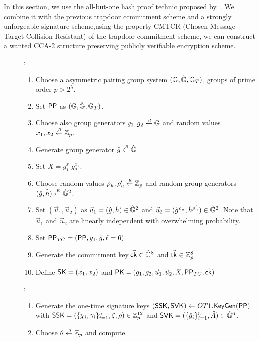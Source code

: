 In this section, we use the all-but-one hash proof technic proposed by~\cite{DBLP:conf/tcc/LibertY12}. We combine it with the previous trapdoor commitment scheme and a strongly unforgeable signature scheme,using the property CMTCR (Chosen-Message Target Collision Resistant) of the trapdoor commitment scheme, we can construct a wanted CCA-2 structure preserving publicly verifiable encryption scheme.
\begin{description}

\item[]:
  \begin{enumerate}
  \item Choose a asymmetric pairing group system $(\mathbb{G}, \hat{\mathbb{G}}, \mathbb{G}_T)$, groups of prime order $p > 2^\lambda$.
  \item Set $\mathsf{PP}$ as $(\mathbb{G}, \hat{\mathbb{G}}, \mathbb{G}_T)$.
  \item Choose also group generators $g_1, g_2 \stackrel{{\scriptscriptstyle \mkern4mu R}}{\gets} \mathbb{G}$ and random values $x_1, x_2 \stackrel{{\scriptscriptstyle \mkern4mu R}}{\gets} \mathbb{Z}_p$.
  \item Generate group generator $\hat{g} \stackrel{{\scriptscriptstyle \mkern4mu R}}{\gets} \hat{\mathbb{G}}$
  \item Set $X = g_1^{x_1}g_2^{x_2}$.
  \item Choose random values $\rho_u,\rho_u' \stackrel{{\scriptscriptstyle \mkern4mu R}}{\gets} \mathbb{Z}_p$ and random group generators $(\hat{g}, \hat{h}) \stackrel{{\scriptscriptstyle \mkern4mu R}}{\gets} \hat{\mathbb{G}}^2$.
  \item Set $(\vec{u}_1, \vec{u}_2)$ as $\vec{u}_1 = (\hat{g}, \hat{h}) \in \hat{\mathbb{G}}^2$ and $\vec{u}_2 =  (\hat{g}^{\rho_u}, \hat{h}^{\rho_u'}) \in \hat{\mathbb{G}}^2$. Note that $\vec{u}_1$ and $\vec{u}_2$ are linearly independent with overwhelming probability.
  \item Set $\mathsf{PP}_{TC} = (\mathsf{PP}, g_1, \hat{g}, \ell = 6)$.
  \item Generate the commitment key $\vec{\mathsf{ck}} \in \hat{\mathbb{G}}^8$ and $\vec{\mathsf{tk}} \in \mathbb{Z}_p^8$
  \item Define $\mathsf{SK} = (x_1, x_2)$ and $\mathsf{PK} = (g_1, g_2, \vec{u}_1, \vec{u}_2, X, \mathsf{PP}_{TC}, \vec{\mathsf{ck}})$
  \end{enumerate}
\item[]:
  \begin{enumerate}
  \item Generate the one-time signature keys $(\mathsf{SSK}, \mathsf{SVK}) \gets OT1.{\mathsf{KeyGen}}(\mathsf{PP})$ with $\mathsf{SSK} = (\{\chi_i, \gamma_i\}_{i=1}^5, \zeta, \rho) \in \mathbb{Z}_p^{12}$ and $\mathsf{SVK} =  (\{\hat{g}_i\}_{i =1}^5,  \hat{A} ) \in \hat{\mathbb{G}}^6$.
  \item Choose $\theta \stackrel{{\scriptscriptstyle \mkern4mu R}}{\gets} \mathbb{Z}_p$ and compute

\end{enumerate}
\end{description}
